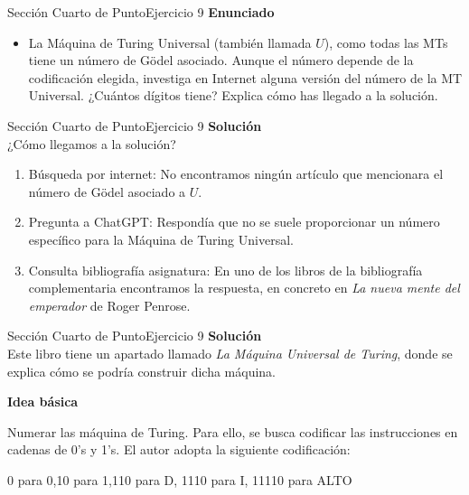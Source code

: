 \documentclass[10pt, envcountsect, presentation, aspectratio=169]{beamer}
\begin{document}

\begin{frame}{Sección Cuarto de Punto}{Ejercicio 9}
    \textbf{Enunciado}
    \begin{itemize}
        \item La Máquina de Turing Universal (también llamada $U$), como todas las MTs tiene un número de Gödel asociado. Aunque el número depende de la codificación elegida, investiga en Internet alguna versión del número de la MT Universal. ¿Cuántos  dígitos tiene? Explica cómo has llegado a la solución.
    \end{itemize}
\end{frame}


\begin{frame}{Sección Cuarto de Punto}{Ejercicio 9}
    \textbf{Solución}\\
    ¿Cómo llegamos a la solución?
    \begin{enumerate}
        \item Búsqueda por internet: No encontramos ningún artículo que mencionara el número de Gödel asociado a $U$.
        \item Pregunta a ChatGPT: Respondía que no se suele proporcionar un número específico para la Máquina de Turing Universal.
        \item Consulta bibliografía asignatura: En uno de los libros de la bibliografía complementaria encontramos la respuesta, en concreto en \textit{La nueva mente del emperador} de Roger Penrose.
    \end{enumerate}
\end{frame}

\begin{frame}{Sección Cuarto de Punto}{Ejercicio 9}
    \textbf{Solución}\\
    Este libro tiene un apartado llamado \textit{La Máquina Universal de Turing}, donde se explica cómo se podría construir dicha máquina.
    \vspace{3mm}
    \begin{center}
        \textbf{Idea básica}
    \end{center}
    
    
    Numerar las máquina de Turing. Para ello, se busca codificar las instrucciones en cadenas de 0's y 1's. El autor adopta la siguiente codificación:
    
    \begin{center}
        0 para 0,\hspace{1cm}10 para 1,\hspace{1cm}110 para D,\hspace{1cm}   1110 para I,\hspace{1cm}   11110 para ALTO
    \end{center}

    
\end{frame}
\end{document}
